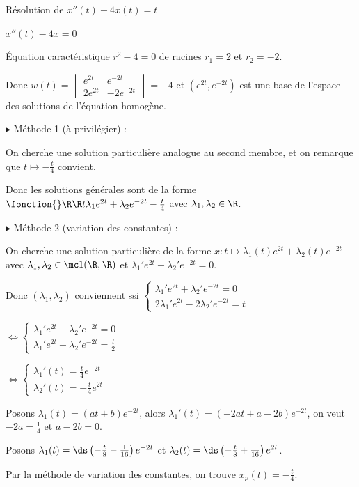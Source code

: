 \begin{exemple}
    Résolution de $x''(t) - 4x(t) = t$

     $x''(t) - 4x = 0$

    \svspace \'Equation caractéristique $r^2 - 4 = 0$ de racines $r_1 = 2$ et $r_2 = -2$.

    Donc $w(t) = \begin{vmatrix}
    e^{2t} & e^{-2t} \\
    2e^{2t} & -2e^{-2t}
    \end{vmatrix} = -4$ et $(e^{2t}, e^{-2t})$ est une base de l'espace des solutions de l'équation homogène.


    \svspace $\blacktriangleright$ Méthode 1 (à privilégier) : 

    On cherche une solution particulière analogue au second membre, et on remarque que $t \mapsto - \frac t 4$ convient. 

    Donc les solutions générales sont de la forme $\fonction{}\R \R t {\lambda_1 e^{2t} + \lambda_2 e^{-2t} - \frac t 4}$ avec $\lambda_1, \lambda_2 \in \R$.

    \lvspace $\blacktriangleright$ Méthode 2 (variation des constantes) :

    On cherche une solution particulière de la forme $x : t \mapsto \lambda_1(t) e^{2t} + \lambda_2(t) e^{-2t}$ 
    avec $\lambda_1, \lambda_2 \in \mc 1(\R, \R)$ et $\lambda_1' e^{2t} + \lambda_2' e^{-2t} = 0$.

    Donc $(\lambda_1, \lambda_2)$ conviennent ssi 
    $\begin{cases}
        \lambda_1' e^{2t} + \lambda_2' e^{-2t} = 0 \\
        2 \lambda_1' e^{2t} - 2 \lambda_2' e^{-2t} = t
    \end{cases}$ 

    $\Leftrightarrow \begin{cases}
    \lambda_1' e^{2t} + \lambda_2' e^{-2t} = 0 \\
    \lambda_1' e^{2t} - \lambda_2' e^{-2t} = \frac t 2
    \end{cases}$

    $\Leftrightarrow \begin{cases}
    \lambda_1'(t) = \frac t 4 e^{-2t} \\
    \lambda_2'(t) = -\frac t 4 e^{2t}
    \end{cases}$

    Posons $\lambda_1(t) = (at + b) e^{-2t}$, alors $\lambda_1'(t) = (-2a t + a - 2b) e^{-2t}$,
    on veut $-2a = \frac 1 4$ et $a - 2b = 0$.

    Posons $\lambda_1(t) = \ds \left( - \frac t 8 - \frac 1 {16} \right) e^{-2t}$
    et $\lambda_2(t) = \ds \left( - \frac t 8 + \frac 1 {16} \right) e^{2t}$. 

    Par la méthode de variation des constantes, on trouve $x_p(t) = - \frac t 4$. 
\end{exemple}

